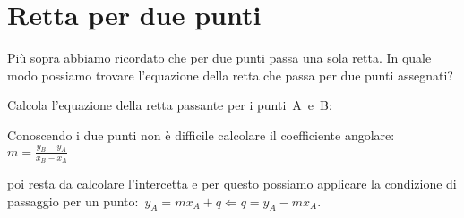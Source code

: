 \section{Retta per due punti}
\label{sec:retta_rettaperduepunti}

Più sopra abbiamo ricordato che per due punti passa una sola retta. 
In quale modo possiamo trovare l'equazione della retta che passa per due 
punti assegnati?

\begin{procedura}
 Calcola l'equazione della retta passante per i punti~A~e~B:
 \begin{enumeratea}
  \item Conoscendo i due punti non è difficile calcolare il coefficiente 
   angolare:~$m = \frac{y_B - y_A}{x_B - x_A}$
  \item poi resta da calcolare l'intercetta e per questo possiamo applicare 
   la condizione di passaggio per un 
   punto:~$y_A = m x_A + q \Leftarrow q = y_A - m x_A$.
 \end{enumeratea}
\end{procedura}


